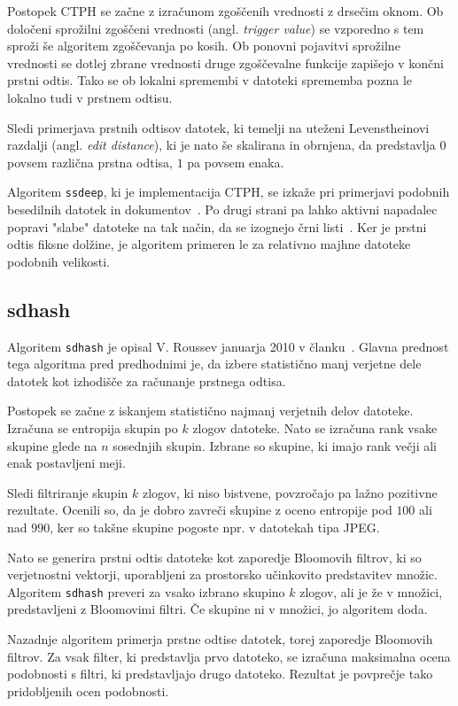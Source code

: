 \documentclass{acm_proc_article-sp}
\begin{document}
Postopek CTPH se začne z izračunom zgoščenih vrednosti z drsečim oknom. Ob določeni sprožilni zgoščeni vrednosti (angl. \emph{trigger value}) se vzporedno s tem sproži še algoritem zgoščevanja po kosih. Ob ponovni pojavitvi sprožilne vrednosti se dotlej zbrane vrednosti druge zgoščevalne funkcije zapišejo v končni prstni odtis.
Tako se ob lokalni spremembi v datoteki sprememba pozna le lokalno tudi v prstnem odtisu.

Sledi primerjava prstnih odtisov datotek, ki temelji na uteženi Levenstheinovi razdalji (angl. \emph{edit distance}), ki je nato še skalirana in obrnjena, da predstavlja $0$ povsem različna prstna odtisa, $1$ pa povsem enaka.

Algoritem \texttt{ssdeep}, ki je implementacija CTPH, se izkaže pri primerjavi podobnih besedilnih datotek in dokumentov~\cite{kornblum:ctph}. Po drugi strani pa lahko aktivni napadalec popravi "slabe" datoteke na tak način, da se izognejo črni listi~\cite{fbhash}. Ker je prstni odtis fiksne dolžine, je algoritem primeren le za relativno majhne datoteke podobnih velikosti.

\subsection{sdhash}
Algoritem \texttt{sdhash} je opisal V. Roussev januarja 2010 v članku~\cite{roussev:sdhash}. Glavna prednost tega algoritma pred predhodnimi je, da izbere statistično manj verjetne dele datotek kot izhodišče za računanje prstnega odtisa.

Postopek se začne z iskanjem statistično najmanj verjetnih delov datoteke. Izračuna se entropija skupin po $k$ zlogov datoteke. Nato se izračuna rank vsake skupine glede na $n$ sosednjih skupin. Izbrane so skupine, ki imajo rank večji ali enak postavljeni meji.

Sledi filtriranje skupin $k$ zlogov, ki niso bistvene, povzročajo pa lažno pozitivne rezultate. Ocenili so, da je dobro zavreči skupine z oceno entropije pod $100$ ali nad $990$, ker so takšne skupine pogoste npr. v datotekah tipa JPEG.

Nato se generira prstni odtis datoteke kot zaporedje Bloomovih filtrov, ki so verjetnostni vektorji, uporabljeni za prostorsko učinkovito predstavitev množic. Algoritem \texttt{sdhash} preveri za vsako izbrano skupino $k$ zlogov, ali je že v množici, predstavljeni z Bloomovimi filtri. Če skupine ni v množici, jo algoritem doda.

Nazadnje algoritem primerja prstne odtise datotek, torej zaporedje Bloomovih filtrov. Za vsak filter, ki predstavlja prvo datoteko, se izračuna maksimalna ocena podobnosti s filtri, ki predstavljajo drugo datoteko. Rezultat je povprečje tako pridobljenih ocen podobnosti.
\end{document}

